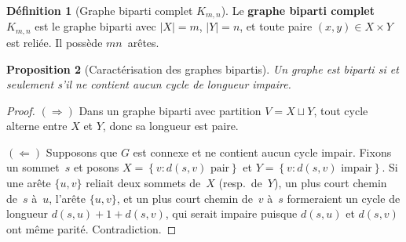 \documentclass[12pt,a4paper,openany]{book}
\theoremstyle{definition}
\newtheorem{definition}{Définition}[chapter]
\theoremstyle{plain}
\newtheorem{proposition}[definition]{Proposition}
\theoremstyle{remark}
\newcommand{\abs}[1]{\left|#1\right|}
\newcommand{\set}[1]{\left\{#1\right\}}
\begin{document}
\begin{definition}[Graphe biparti complet $K_{m,n}$]
\label{def:biparti-complet}
Le \textbf{graphe biparti complet} $K_{m,n}$ est le graphe biparti avec
$\abs{X} = m$, $\abs{Y} = n$, et toute paire $(x, y) \in X \times Y$ est
reliée. Il possède $mn$~arêtes.
\end{definition}

\begin{center}
\label{fig:bipartis}
\end{center}

\begin{proposition}[Caractérisation des graphes bipartis]
\label{prop:biparti-carac}
Un graphe est biparti si et seulement s'il ne contient aucun cycle de
longueur impaire.
\end{proposition}

\begin{proof}
$(\Rightarrow)$ Dans un graphe biparti avec partition $V = X \sqcup Y$, tout
cycle alterne entre $X$ et $Y$, donc sa longueur est paire.

$(\Leftarrow)$ Supposons que $G$ est connexe et ne contient aucun cycle impair.
Fixons un sommet~$s$ et posons $X = \set{v : d(s,v) \text{ pair}}$ et
$Y = \set{v : d(s,v) \text{ impair}}$. Si une arête $\{u,v\}$ reliait deux
sommets de~$X$ (resp.\ de~$Y$), un plus court chemin de~$s$ à~$u$, l'arête
$\{u,v\}$, et un plus court chemin de~$v$ à~$s$ formeraient un cycle de longueur
$d(s,u) + 1 + d(s,v)$, qui serait impaire puisque $d(s,u)$ et $d(s,v)$ ont même
parité. Contradiction.
\end{proof}
\end{document}
